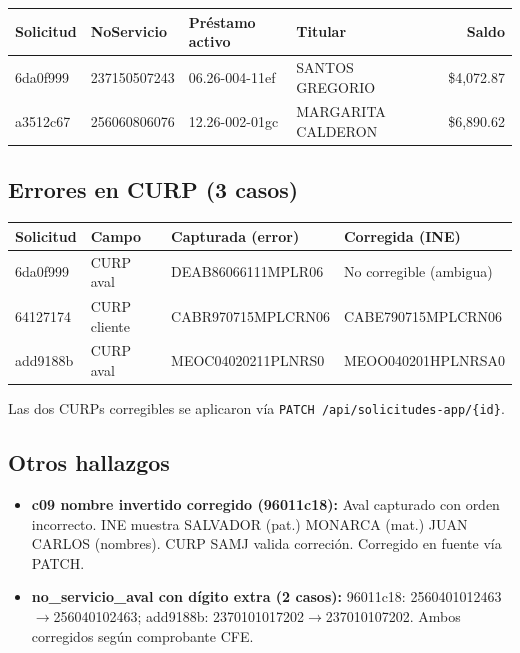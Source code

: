 \documentclass[11pt,a4paper]{article}
\begin{document}
\begin{center}
\begin{tabular}{@{}p{2.2cm}p{3cm}p{2.8cm}p{2.5cm}r@{}}
\toprule
\textbf{Solicitud} & \textbf{NoServicio} & \textbf{Pr\'estamo activo} & \textbf{Titular} & \textbf{Saldo} \\
\midrule
6da0f999 & 237150507243 & 06.26-004-11ef & SANTOS GREGORIO & \$4,072.87 \\
a3512c67 & 256060806076 & 12.26-002-01gc & MARGARITA CALDERON & \$6,890.62 \\
\bottomrule
\end{tabular}
\end{center}

\subsection{Errores en CURP (3 casos)}

\begin{center}
\begin{tabular}{@{}p{2.5cm}p{2cm}p{4cm}p{4cm}@{}}
\toprule
\textbf{Solicitud} & \textbf{Campo} & \textbf{Capturada (error)} & \textbf{Corregida (INE)} \\
\midrule
6da0f999 & CURP aval & DEAB86066111MPLR06 & No corregible (ambigua) \\
64127174 & CURP cliente & CABR970715MPLCRN06 & CABE790715MPLCRN06 \\
add9188b & CURP aval & MEOC04020211PLNRS0 & MEOO040201HPLNRSA0 \\
\bottomrule
\end{tabular}
\end{center}

Las dos CURPs corregibles se aplicaron v\'ia \texttt{PATCH /api/solicitudes-app/\{id\}}.

\subsection{Otros hallazgos}

\begin{itemize}
  \item \textbf{c09 nombre invertido corregido (96011c18):} Aval capturado con orden incorrecto.
    INE muestra SALVADOR (pat.) MONARCA (mat.) JUAN CARLOS (nombres). CURP SAMJ valida correci\'on.
    Corregido en fuente v\'ia PATCH.
  \item \textbf{no\_servicio\_aval con d\'igito extra (2 casos):} 96011c18: 2560401012463$\to$256040102463;
    add9188b: 2370101017202$\to$237010107202. Ambos corregidos seg\'un comprobante CFE.
\end{itemize}
\end{document}
